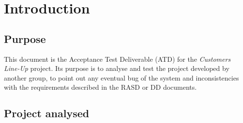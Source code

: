 \chapter{Introduction}

\section{Purpose}
This document is the Acceptance Test Deliverable (ATD) for the \textit{Customers Line-Up} project. Its purpose is to analyse and test the project developed by another group, to point out any eventual bug of the system and inconsistencies with the requirements described in the RASD or DD documents.


\section{Project analysed}